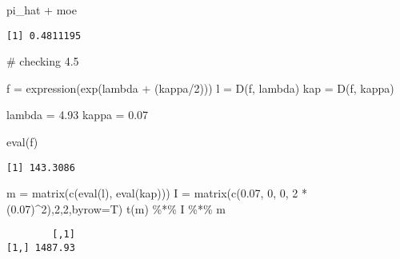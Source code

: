 \documentclass[
  letterpaper,
  DIV=11,
  numbers=noendperiod]{scrartcl}
\newenvironment{Shaded}{\begin{snugshade}}{\end{snugshade}}
\newcommand{\AttributeTok}[1]{\textcolor[rgb]{0.40,0.45,0.13}{#1}}
\newcommand{\CommentTok}[1]{\textcolor[rgb]{0.37,0.37,0.37}{#1}}
\newcommand{\DecValTok}[1]{\textcolor[rgb]{0.68,0.00,0.00}{#1}}
\newcommand{\FloatTok}[1]{\textcolor[rgb]{0.68,0.00,0.00}{#1}}
\newcommand{\FunctionTok}[1]{\textcolor[rgb]{0.28,0.35,0.67}{#1}}
\newcommand{\NormalTok}[1]{\textcolor[rgb]{0.00,0.23,0.31}{#1}}
\newcommand{\OtherTok}[1]{\textcolor[rgb]{0.00,0.23,0.31}{#1}}
\newcommand{\SpecialCharTok}[1]{\textcolor[rgb]{0.37,0.37,0.37}{#1}}
\newcommand{\StringTok}[1]{\textcolor[rgb]{0.13,0.47,0.30}{#1}}
\begin{document}
\begin{Shaded}
\begin{Highlighting}[]
\NormalTok{pi\_hat }\SpecialCharTok{+}\NormalTok{ moe}
\end{Highlighting}
\end{Shaded}

\begin{verbatim}
[1] 0.4811195
\end{verbatim}

\begin{Shaded}
\begin{Highlighting}[]
\CommentTok{\# checking 4.5}

\NormalTok{f }\OtherTok{=} \FunctionTok{expression}\NormalTok{(}\FunctionTok{exp}\NormalTok{(lambda }\SpecialCharTok{+}\NormalTok{ (kappa}\SpecialCharTok{/}\DecValTok{2}\NormalTok{)))}
\NormalTok{l }\OtherTok{=} \FunctionTok{D}\NormalTok{(f, }\StringTok{\textquotesingle{}lambda\textquotesingle{}}\NormalTok{)}
\NormalTok{kap }\OtherTok{=} \FunctionTok{D}\NormalTok{(f, }\StringTok{\textquotesingle{}kappa\textquotesingle{}}\NormalTok{)}

\NormalTok{lambda }\OtherTok{=} \FloatTok{4.93}
\NormalTok{kappa }\OtherTok{=} \FloatTok{0.07}

\FunctionTok{eval}\NormalTok{(f)}
\end{Highlighting}
\end{Shaded}

\begin{verbatim}
[1] 143.3086
\end{verbatim}

\begin{Shaded}
\begin{Highlighting}[]
\NormalTok{m }\OtherTok{=} \FunctionTok{matrix}\NormalTok{(}\FunctionTok{c}\NormalTok{(}\FunctionTok{eval}\NormalTok{(l), }\FunctionTok{eval}\NormalTok{(kap)))}
\NormalTok{I }\OtherTok{=} \FunctionTok{matrix}\NormalTok{(}\FunctionTok{c}\NormalTok{(}\FloatTok{0.07}\NormalTok{, }\DecValTok{0}\NormalTok{, }\DecValTok{0}\NormalTok{, }\DecValTok{2} \SpecialCharTok{*}\NormalTok{ (}\FloatTok{0.07}\NormalTok{)}\SpecialCharTok{\^{}}\DecValTok{2}\NormalTok{),}\DecValTok{2}\NormalTok{,}\DecValTok{2}\NormalTok{,}\AttributeTok{byrow=}\NormalTok{T)}
\FunctionTok{t}\NormalTok{(m) }\SpecialCharTok{\%*\%}\NormalTok{ I }\SpecialCharTok{\%*\%}\NormalTok{ m}
\end{Highlighting}
\end{Shaded}

\begin{verbatim}
        [,1]
[1,] 1487.93
\end{verbatim}
\end{document}
